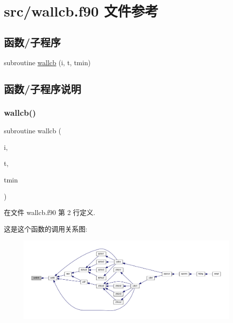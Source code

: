 \hypertarget{wallcb_8f90}{}\section{src/wallcb.f90 文件参考}
\label{wallcb_8f90}
\subsection*{函数/子程序}
\begin{DoxyCompactItemize}
\item 
subroutine \mbox{\hyperlink{wallcb_8f90_a18238f9bfe56a3af3455a39f2e0aa8cc}{wallcb}} (i, t, tmin)
\end{DoxyCompactItemize}


\subsection{函数/子程序说明}
\mbox{\label{wallcb_8f90_a18238f9bfe56a3af3455a39f2e0aa8cc}} 
\subsubsection{\texorpdfstring{wallcb()}{wallcb()}}
{\footnotesize\ttfamily subroutine wallcb (\begin{DoxyParamCaption}\item[{}]{i,  }\item[{}]{t,  }\item[{}]{tmin }\end{DoxyParamCaption})}



在文件 wallcb.\+f90 第 2 行定义.

这是这个函数的调用关系图\+:
\nopagebreak
\begin{figure}[H]
\begin{center}
\leavevmode
\includegraphics[width=350pt]{wallcb_8f90_a18238f9bfe56a3af3455a39f2e0aa8cc_icgraph}
\end{center}
\end{figure}
